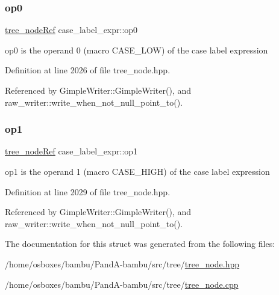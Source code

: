 \mbox{\label{structcase__label__expr_ab3967696c3ca6cd2654311be7520f636}} 
\subsubsection{\texorpdfstring{op0}{op0}}
{\footnotesize\ttfamily \hyperlink{tree__node_8hpp_a6ee377554d1c4871ad66a337eaa67fd5}{tree\+\_\+node\+Ref} case\+\_\+label\+\_\+expr\+::op0}



op0 is the operand 0 (macro C\+A\+S\+E\+\_\+\+L\+OW) of the case label expression 



Definition at line 2026 of file tree\+\_\+node.\+hpp.



Referenced by Gimple\+Writer\+::\+Gimple\+Writer(), and raw\+\_\+writer\+::write\+\_\+when\+\_\+not\+\_\+null\+\_\+point\+\_\+to().

\mbox{\label{structcase__label__expr_ae838f5c5b5ee6663e739f88f4cc1595e}} 
\subsubsection{\texorpdfstring{op1}{op1}}
{\footnotesize\ttfamily \hyperlink{tree__node_8hpp_a6ee377554d1c4871ad66a337eaa67fd5}{tree\+\_\+node\+Ref} case\+\_\+label\+\_\+expr\+::op1}



op1 is the operand 1 (macro C\+A\+S\+E\+\_\+\+H\+I\+GH) of the case label expression 



Definition at line 2029 of file tree\+\_\+node.\+hpp.



Referenced by Gimple\+Writer\+::\+Gimple\+Writer(), and raw\+\_\+writer\+::write\+\_\+when\+\_\+not\+\_\+null\+\_\+point\+\_\+to().



The documentation for this struct was generated from the following files\+:\begin{DoxyCompactItemize}
\item 
/home/osboxes/bambu/\+Pand\+A-\/bambu/src/tree/\hyperlink{tree__node_8hpp}{tree\+\_\+node.\+hpp}\item 
/home/osboxes/bambu/\+Pand\+A-\/bambu/src/tree/\hyperlink{tree__node_8cpp}{tree\+\_\+node.\+cpp}\end{DoxyCompactItemize}
